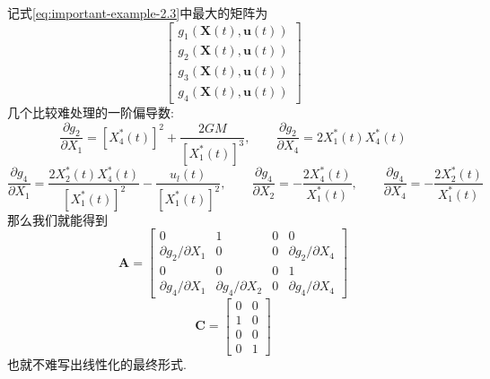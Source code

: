 \documentclass[cn,10pt,citestyle=gb7714-2015,bibstyle=gb7714-2015]{elegantbook}
\begin{document}
\begin{solution}
  记式\eqref{eq:important-example-2.3}中最大的矩阵为
  \[
      \begin{bmatrix}
        g_1(\bm{X}(t),\bm{u}(t))\\
        g_2(\bm{X}(t),\bm{u}(t))\\
        g_3(\bm{X}(t),\bm{u}(t))\\
        g_4(\bm{X}(t),\bm{u}(t))
      \end{bmatrix}
  \]
  几个比较难处理的一阶偏导数:
  \[
      \frac{\partial g_2}{\partial X_1}=[X_4^*(t)]^2+\frac{2GM}{[X_1^*(t)]^3},\qquad\frac{\partial g_2}{\partial X_4}=2X_1^*(t)X_4^*(t)
  \]
  \[
      \frac{\partial g_4}{\partial X_1}=\frac{2X_2^*(t)X_4^*(t)}{[X_1^*(t)]^2}-\frac{u_l(t)}{[X_1^*(t)]^2},\qquad\frac{\partial g_4}{\partial X_2}=-\frac{2X_4^*(t)}{X_1^*(t)},\qquad\frac{\partial g_4}{\partial X_4}=-\frac{2X_2^*(t)}{X_1^*(t)}
  \]
  那么我们就能得到
  \[
      \bm{A}=\begin{bmatrix}
        0&1&0&0\\
        \partial g_2/\partial X_1&0&0&\partial g_2/\partial X_4\\
        0&0&0&1\\
        \partial g_4/\partial X_1&\partial g_4/\partial X_2&0&\partial g_4/\partial X_4
      \end{bmatrix}
  \]
  \[
    \bm{C}=\begin{bmatrix}
      0&0\\
      1&0\\
      0&0\\
      0&1
    \end{bmatrix}
  \]  
  也就不难写出线性化的最终形式.
\end{solution}
\end{document}
